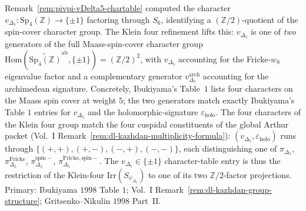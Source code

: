 \begin{remark}
\label{rem:pivpi-klein-four-refinement}
Remark~\ref{rem:pivpi-vDelta5-chartable} computed the
character $v_{\Delta_5}\colon\mathrm{Sp}_4(\mathbb Z) \to\{\pm 1\}$
factoring through $S_6$, identifying a $(\mathbb Z/2)$-quotient of the
spin-cover character group. The Klein four refinement lifts this:
$v_{\Delta_5}$ is one of \emph{two} generators of the full
Maass-spin-cover character group
$\mathrm{Hom}(\widetilde{\mathrm{Sp}_4(\mathbb Z)}^{\mathrm{ab}},
\{\pm 1\}) = (\mathbb Z/2)^2$, with $v_{\Delta_5}$ accounting for the
Fricke-$w_8$ eigenvalue factor and a complementary generator
$v^{\mathrm{arch}}_{\Delta_5}$ accounting for the archimedean
signature. Concretely, Ibukiyama's Table~$1$
\cite{Ibukiyama1998Paramodular} lists four characters on the Maass
spin cover at weight $5$; the two generators match exactly
Ibukiyama's Table $1$ entries for $v_{\Delta_5}$ and the
holomorphic-signature $\varepsilon_{\mathrm{holo}}$. The four
characters of the Klein four group match the four cuspidal
constituents of the global Arthur packet
(Vol.~I Remark~\ref{rem:dl-kazhdan-multiplicity-formula}):
$(v_{\Delta_5}, \varepsilon_{\mathrm{holo}})$ runs through
$\{(+,+), (+,-), (-,+), (-,-)\}$, each distinguishing one of
$\pi_{\Delta_5}$, $\pi_{\Delta_5}^{\mathrm{Fricke}}$,
$\pi_{\Delta_5}^{\mathrm{spin-}}$,
$\pi_{\Delta_5}^{\mathrm{Fricke, spin-}}$. The
$v_{\Delta_5}\in\{\pm 1\}$ character-table entry is thus the
restriction of the Klein-four $\mathrm{Irr}(S_{\psi_{\Delta_5}})$
to one of its two $\mathbb Z/2$-factor projections. Primary:
Ibukiyama $1998$ Table $1$; Vol.~I
Remark~\ref{rem:dl-kazhdan-group-structure};
Gritsenko--Nikulin $1998$ Part~II.
\end{remark}
